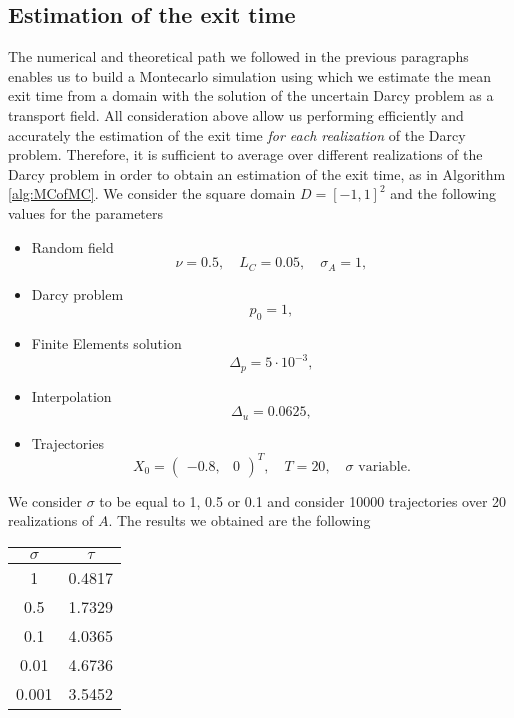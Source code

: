 \subsection{Estimation of the exit time}

The numerical and theoretical path we followed in the previous paragraphs enables us to build a Montecarlo simulation using which we estimate the mean exit time from a domain with the solution of the uncertain Darcy problem as a transport field. All consideration above allow us performing efficiently and accurately the estimation of the exit time \textit{for each realization} of the Darcy problem. Therefore, it is sufficient to average over different realizations of the Darcy problem in order to obtain an estimation of the exit time, as in Algorithm \ref{alg:MCofMC}. We consider the square domain $D = [-1, 1]^2$ and the following values for the parameters
\begin{itemize}
	\item Random field
	\begin{equation*}
		\nu = 0.5, \quad L_C = 0.05, \quad \sigma_A = 1,
	\end{equation*}
	\item Darcy problem
	\begin{equation*}
		p_0 = 1,
	\end{equation*}
	\item Finite Elements solution
	\begin{equation*}
		\Delta_p = 5\cdot 10^{-3},
	\end{equation*}
	\item Interpolation
	\begin{equation*}
		\Delta_u = 0.0625,
	\end{equation*}
	\item Trajectories
	\begin{equation*}
		X_0 = \begin{pmatrix} -0.8, & 0 \end{pmatrix}^T, \quad T = 20, \quad \sigma \text{ variable}.
	\end{equation*}
\end{itemize}

\noindent We consider $\sigma$ to be equal to 1, 0.5 or 0.1 and consider 10000 trajectories over 20 realizations of $A$. The results we obtained are the following 

\begin{center}
 	\begin{tabular}{|c c|} 
 	\hline
 	$\sigma$ & $\tau$ \\ [0.5ex] 
 	\hline\hline
	1 & 0.4817 \\ 
 	\hline
 	0.5 & 1.7329 \\
 	\hline
 	0.1 & 4.0365 \\
 	\hline
	0.01 & 4.6736 \\
	\hline
	0.001 & 3.5452 \\
	\hline
\end{tabular}
\end{center}

